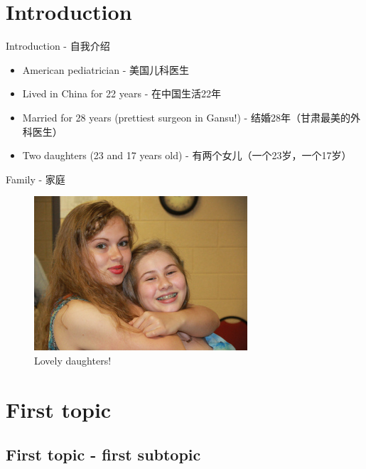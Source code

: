 \section{Introduction}\label{introduction}

\begin{frame}{Introduction - 自我介绍}

\begin{itemize}
\itemsep1pt\parskip0pt
\item
  American pediatrician - 美国儿科医生
\item
  Lived in China for 22 years - 在中国生活22年
\item
  Married for 28 years (prettiest surgeon in Gansu!) -
  结婚28年（甘肃最美的外科医生）
\item
  Two daughters (23 and 17 years old) - 有两个女儿（一个23岁，一个17岁）
\end{itemize}

\end{frame}

\begin{frame}{Family - 家庭}

\begin{figure}[htbp]
\centering
\includegraphics{./img/img_0002_300.jpg}
\caption{Lovely daughters!}
\end{figure}

\end{frame}

\section{First topic}\label{first-topic}

\frame{\tableofcontents[hideothersubsections]}

\subsection{First topic - first
subtopic}\label{first-topic---first-subtopic}

